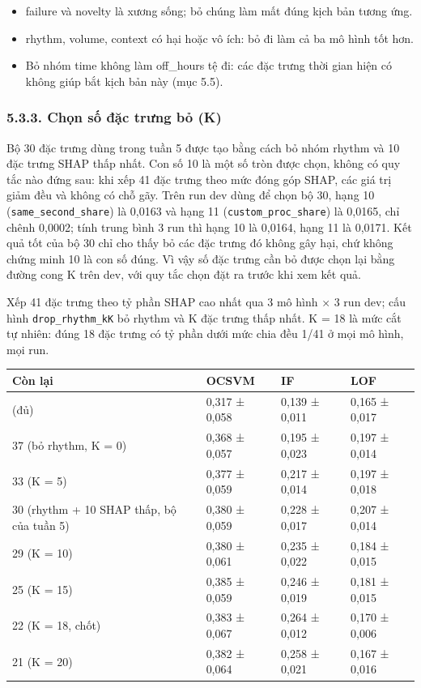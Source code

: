 \documentclass[
  11pt,
]{article}
\providecommand{\tightlist}{%
  \setlength{\itemsep}{0pt}\setlength{\parskip}{0pt}}
\begin{document}
\begin{itemize}
\tightlist
\item
  failure và novelty là xương sống; bỏ chúng làm mất đúng kịch bản tương
  ứng.
\item
  rhythm, volume, context có hại hoặc vô ích: bỏ đi làm cả ba mô hình
  tốt hơn.
\item
  Bỏ nhóm time không làm off\_\allowbreak{}hours tệ đi: các đặc trưng
  thời gian hiện có không giúp bắt kịch bản này (mục 5.5).
\end{itemize}

\hypertarget{chux1ecdn-sux1ed1-ux111ux1eb7c-trux1b0ng-bux1ecf-k}{%
\subsubsection{5.3.3. Chọn số đặc trưng bỏ
(K)}\label{chux1ecdn-sux1ed1-ux111ux1eb7c-trux1b0ng-bux1ecf-k}}

Bộ 30 đặc trưng dùng trong tuần 5 được tạo bằng cách bỏ nhóm rhythm và
10 đặc trưng SHAP thấp nhất. Con số 10 là một số tròn được chọn, không
có quy tắc nào đứng sau: khi xếp 41 đặc trưng theo mức đóng góp SHAP,
các giá trị giảm đều và không có chỗ gãy. Trên run dev dùng để chọn bộ
30, hạng 10 (\texttt{same\_\allowbreak{}second\_\allowbreak{}share}) là
0,0163 và hạng 11
(\texttt{custom\_\allowbreak{}proc\_\allowbreak{}share}) là 0,0165, chỉ
chênh 0,0002; tính trung bình 3 run thì hạng 10 là 0,0164, hạng 11 là
0,0171. Kết quả tốt của bộ 30 chỉ cho thấy bỏ các đặc trưng đó không gây
hại, chứ không chứng minh 10 là con số đúng. Vì vậy số đặc trưng cần bỏ
được chọn lại bằng đường cong K trên dev, với quy tắc chọn đặt ra trước
khi xem kết quả.

Xếp 41 đặc trưng theo tỷ phần \textbar SHAP\textbar{} cao nhất qua 3 mô
hình × 3 run dev; cấu hình
\texttt{drop\_\allowbreak{}rhythm\_\allowbreak{}kK} bỏ rhythm và K đặc
trưng thấp nhất. K = 18 là mức cắt tự nhiên: đúng 18 đặc trưng có tỷ
phần dưới mức chia đều 1/41 ở mọi mô hình, mọi run.

\begin{longtable}[]{@{}llll@{}}
\toprule\noalign{}
Còn lại & OCSVM & IF & LOF \\
\midrule\noalign{}
\endhead
\bottomrule\noalign{}
\endlastfoot
41 (đủ) & 0,317 ± 0,058 & 0,139 ± 0,011 & 0,165 ± 0,017 \\
37 (bỏ rhythm, K = 0) & 0,368 ± 0,057 & 0,195 ± 0,023 & 0,197 ± 0,014 \\
33 (K = 5) & 0,377 ± 0,059 & 0,217 ± 0,014 & 0,197 ± 0,018 \\
30 (rhythm + 10 SHAP thấp, bộ của tuần 5) & 0,380 ± 0,059 & 0,228 ±
0,017 & 0,207 ± 0,014 \\
29 (K = 10) & 0,380 ± 0,061 & 0,235 ± 0,022 & 0,184 ± 0,015 \\
25 (K = 15) & 0,385 ± 0,059 & 0,246 ± 0,019 & 0,181 ± 0,015 \\
22 (K = 18, chốt) & 0,383 ± 0,067 & 0,264 ± 0,012 & 0,170 ± 0,006 \\
21 (K = 20) & 0,382 ± 0,064 & 0,258 ± 0,021 & 0,167 ± 0,016 \\
\end{longtable}
\end{document}
